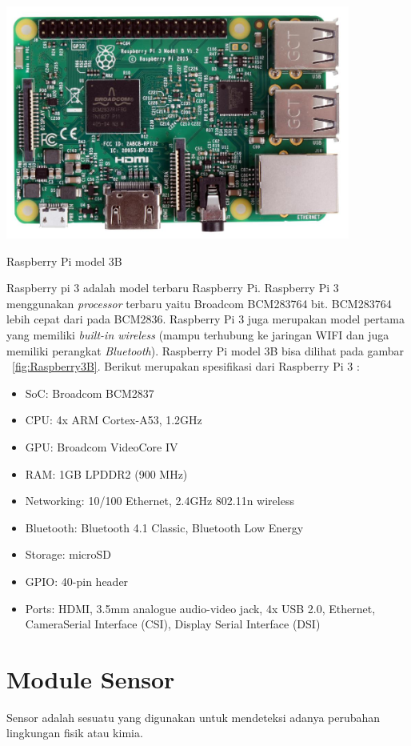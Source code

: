 \begin{afigure} 
    \includegraphics[width=0.85\textwidth, center]{images/raspberry pi 3b.jpg}
    \caption{Raspberry Pi model 3B}
    \label{fig:Raspberry3B}
\end{afigure}

Raspberry pi 3 adalah model terbaru Raspberry Pi. Raspberry Pi 3 menggunakan \textit{processor} terbaru yaitu Broadcom BCM283764 bit. BCM283764 lebih cepat dari pada BCM2836. Raspberry Pi 3 juga merupakan model pertama yang memiliki \textit{built-in wireless} (mampu terhubung ke jaringan WIFI dan juga memiliki perangkat \textit{Bluetooth}). Raspberry Pi model 3B bisa dilihat pada gambar ~\ref{fig:Raspberry3B}. Berikut merupakan spesifikasi dari Raspberry Pi 3 :

\begin{itemize}[topsep=0pt,itemsep=0pt,partopsep=0pt, parsep=0pt,]
    \item SoC: Broadcom BCM2837
    \item CPU: 4x ARM Cortex-A53, 1.2GHz
    \item GPU: Broadcom VideoCore IV
    \item RAM: 1GB LPDDR2 (900 MHz)
    \item Networking: 10/100 Ethernet, 2.4GHz 802.11n wireless
    \item Bluetooth: Bluetooth 4.1 Classic, Bluetooth Low Energy
    \item Storage: microSD
    \item GPIO: 40-pin header
    \item Ports: HDMI, 3.5mm analogue audio-video jack, 4x USB 2.0, Ethernet, CameraSerial Interface (CSI), Display Serial Interface (DSI)
\end{itemize}

\section{Module Sensor}
Sensor adalah sesuatu yang digunakan untuk mendeteksi adanya perubahan lingkungan fisik atau kimia.

